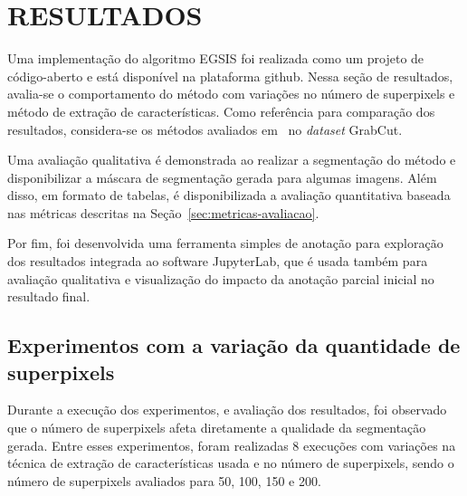 \chapter{RESULTADOS}\label{chap:resultados}

Uma implementação do algoritmo EGSIS foi realizada como um projeto de
código-aberto e está disponível na plataforma
github\footnotemark. Nessa seção de resultados, avalia-se o
comportamento do método com variações no número de superpixels e
método de extração de características. Como referência para comparação
dos resultados, considera-se os métodos avaliados
em~ no \textit{dataset} GrabCut.


Uma avaliação qualitativa é demonstrada ao realizar a segmentação do
método e disponibilizar a máscara de segmentação gerada para algumas
imagens. Além disso, em formato de tabelas, é disponibilizada a
avaliação quantitativa baseada nas métricas descritas na
Seção~\ref{sec:metricas-avaliacao}.

Por fim, foi desenvolvida uma ferramenta simples de anotação para
exploração dos resultados integrada ao software
JupyterLab\footnotemark, que é usada também para avaliação qualitativa
e visualização do impacto da anotação parcial inicial no resultado
final.


\section{Experimentos com a variação da quantidade de superpixels}\label{sec:variacao-superpixels}

Durante a execução dos experimentos, e avaliação dos resultados, foi
observado que o número de superpixels afeta diretamente a qualidade da
segmentação gerada. Entre esses experimentos, foram realizadas 8
execuções com variações na técnica de extração de características
usada e no número de superpixels, sendo o número de superpixels
avaliados para 50, 100, 150 e 200.

